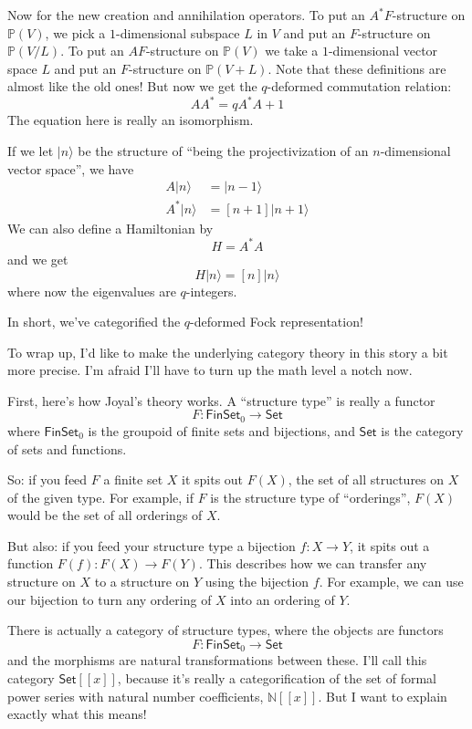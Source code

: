 \documentclass{article}
\begin{document}
Now for the new creation and annihilation operators. To put an
\(A^*F\)-structure on \(\mathbb{P}(V)\), we pick a \(1\)-dimensional
subspace \(L\) in \(V\) and put an \(F\)-structure on
\(\mathbb{P}(V/L)\). To put an \(AF\)-structure on \(\mathbb{P}(V)\) we
take a \(1\)-dimensional vector space \(L\) and put an \(F\)-structure
on \(\mathbb{P}(V+L)\). Note that these definitions are almost like the
old ones! But now we get the \(q\)-deformed commutation relation:
\[A A^* = q A^* A + 1\] The equation here is really an isomorphism.

If we let \(\vert n\rangle\) be the structure of ``being the
projectivization of an \(n\)-dimensional vector space'', we have \[
  \begin{aligned}
    A\vert n\rangle &= \vert n-1\rangle
  \\A^*\vert n\rangle &= [n+1] \vert n+1\rangle
  \end{aligned}
\] We can also define a Hamiltonian by \[H = A^* A\] and we get
\[H\vert n\rangle = [n] \vert n\rangle\] where now the eigenvalues are
\(q\)-integers.

In short, we've categorified the \(q\)-deformed Fock representation!

To wrap up, I'd like to make the underlying category theory in this
story a bit more precise. I'm afraid I'll have to turn up the math level
a notch now.

First, here's how Joyal's theory works. A ``structure type'' is really a
functor \[F\colon \mathsf{FinSet}_0 \to \mathsf{Set}\] where
\(\mathsf{FinSet}_0\) is the groupoid of finite sets and bijections, and
\(\mathsf{Set}\) is the category of sets and functions.

So: if you feed \(F\) a finite set \(X\) it spits out \(F(X)\), the set
of all structures on \(X\) of the given type. For example, if \(F\) is
the structure type of ``orderings'', \(F(X)\) would be the set of all
orderings of \(X\).

But also: if you feed your structure type a bijection
\(f\colon X \to Y\), it spits out a function
\(F(f)\colon F(X) \to F(Y)\). This describes how we can transfer any
structure on \(X\) to a structure on \(Y\) using the bijection \(f\).
For example, we can use our bijection to turn any ordering of \(X\) into
an ordering of \(Y\).

There is actually a category of structure types, where the objects are
functors \[F\colon \mathsf{FinSet}_0 \to \mathsf{Set}\] and the
morphisms are natural transformations between these. I'll call this
category \(\mathsf{Set}[[x]]\), because it's really a categorification
of the set of formal power series with natural number coefficients,
\(\mathbb{N}[[x]]\). But I want to explain exactly what this means!
\end{document}

